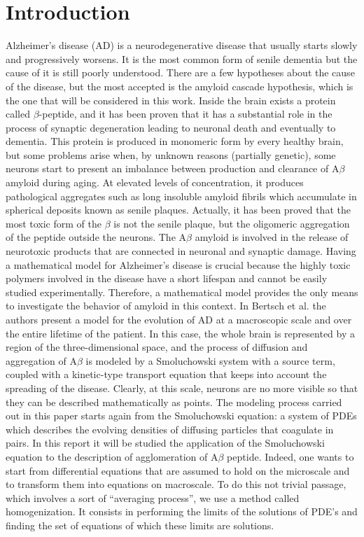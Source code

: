\section{Introduction}
Alzheimer's disease (AD) is a neurodegenerative disease that usually starts slowly and progressively worsens. It is the most common form of senile dementia but the cause of it is still poorly understood. 
There are a few hypotheses about the cause of the disease, but the most accepted is the amyloid cascade hypothesis, which is the one that will be considered in this work.
Inside the brain exists a protein called \(\beta\)-peptide, and it has been proven that it has a substantial role in the process of synaptic degeneration leading to neuronal death and eventually to dementia. This protein is produced in monomeric form by every healthy brain, but some problems arise when,  by unknown reasons (partially genetic), some neurons start to present an imbalance between production and clearance of $\mathrm{A} \beta$ amyloid during aging. At elevated levels of concentration, it produces pathological aggregates such as long insoluble amyloid fibrils which accumulate in spherical deposits known as senile plaques. Actually, it has been proved that the most toxic form of the \(\beta\) is not the senile plaque, but the oligomeric aggregation of the peptide outside the neurons. The $\mathrm{A} \beta$ amyloid is involved in the release of neurotoxic products that are connected in neuronal and synaptic damage.
Having a mathematical model for Alzheimer's disease is crucial because the highly toxic polymers involved in the disease have a short lifespan and cannot be easily studied experimentally. Therefore, a mathematical model provides the only means to investigate the behavior of amyloid in this context.
In Bertsch et al. \cite{Bertsch} the authors present a model for the evolution of AD at a macroscopic scale and over the entire lifetime of the patient. In this case, the whole brain is represented by a region of the three-dimensional space, and the process of diffusion and aggregation of \(\mathrm{A}\beta\) is modeled by a Smoluchowski system with a source term, coupled with a kinetic-type transport equation that keeps into account the spreading of the disease. Clearly, at this scale, neurons are no more visible so that they can be described mathematically as points.
The modeling process carried out in this paper starts again from the Smoluchowski equation: a system of PDEs which describes the evolving densities of diffusing particles that coagulate in pairs. In this report it will be studied the application of the Smoluchowski equation to the description of agglomeration of $\mathrm{A} \beta$ peptide. Indeed, one wants to start from differential equations that are assumed to hold on the microscale and to transform them into equations on macroscale. To do this not trivial passage, which involves a sort of ``averaging process'', we use a method called homogenization. It consists in performing the limits of the solutions of PDE's and finding the set of equations of which these limits are solutions. 

